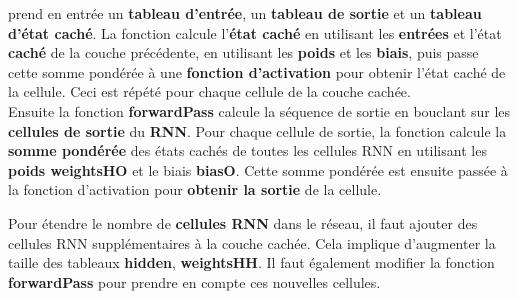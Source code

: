 \begin{enumerate}
{    prend en entrée un \textbf{tableau d'entrée}, un \textbf{tableau de sortie} et un \textbf{tableau d'état caché}. La fonction calcule l'\textbf{état caché} en utilisant les \textbf{entrées} et l'état \textbf{caché}
    de la couche précédente, en utilisant les \textbf{poids} et les \textbf{biais}, puis passe cette somme pondérée à une \textbf{fonction d'activation} pour obtenir l'état caché de la cellule. Ceci est répété pour chaque 
    cellule de la couche cachée. \\
    Ensuite la fonction \textbf{forwardPass} calcule la séquence de sortie en bouclant sur les \textbf{cellules de sortie} du \textbf{RNN}. Pour chaque cellule de sortie, la fonction calcule la \textbf{somme pondérée} des états
    cachés de toutes les cellules RNN en utilisant les \textbf{poids weightsHO} et le biais \textbf{biasO}. Cette somme pondérée est ensuite passée à la fonction d'activation pour \textbf{obtenir la sortie} de la cellule.
  
    Pour étendre le nombre de \textbf{cellules RNN} dans le réseau, il faut ajouter des cellules RNN supplémentaires à la couche cachée. Cela implique d'augmenter la taille des tableaux \textbf{hidden}, \textbf{weightsHH}.
    Il faut également modifier la fonction \textbf{forwardPass} pour prendre en compte ces nouvelles cellules.
  }
\end{enumerate}